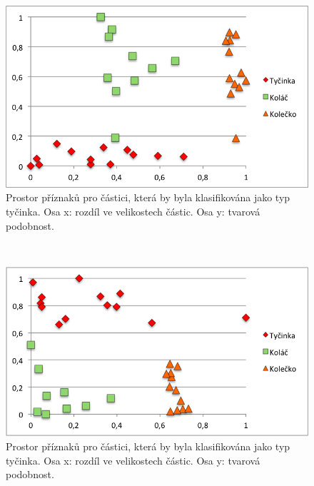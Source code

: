 \documentclass[11pt,twoside,a4paper,table]{book}
\begin{document}
\begin{figure}[H]
	\centering
	\includegraphics[height=0.3\textheight]{figures/feature_space_tycinka.png}
	\caption{Prostor příznaků pro částici, která by byla klasifikována jako typ tyčinka. Osa x: rozdíl ve velikostech částic. Osa y: tvarová podobnost. }
	\label{fig:feature_space_tycinka}
\end{figure}
~
\begin{figure}[H]
	\centering
	\includegraphics[height=0.3\textheight]{figures/feature_space_kolac.png}
	
	\caption{Prostor příznaků pro částici, která by byla klasifikována jako typ tyčinka. Osa x: rozdíl ve velikostech částic. Osa y: tvarová podobnost.}
	\label{fig:feature_space_kolac}
\end{figure}
~
\end{document}
